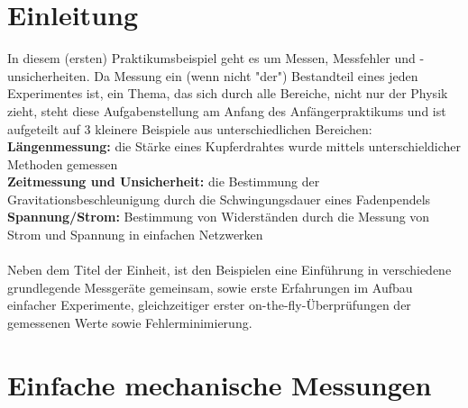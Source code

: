 \documentclass[12pt,a4paper]{article}
\begin{document}
\pagebreak
\setlength{\columnsep}{20pt}
\begin{multicols}{2}
\section{Einleitung}
In diesem (ersten) Praktikumsbeispiel geht es um Messen, Messfehler und -unsicherheiten.
Da Messung ein (wenn nicht "der") Bestandteil eines jeden Experimentes ist, ein Thema, das sich durch alle Bereiche, nicht nur der Physik zieht, steht diese Aufgabenstellung am Anfang des Anfängerpraktikums und ist aufgeteilt auf 3 kleinere Beispiele aus unterschiedlichen Bereichen:\\
\textbf{Längenmessung:} die Stärke eines Kupferdrahtes wurde mittels unterschieldicher Methoden gemessen\\
\textbf{Zeitmessung und Unsicherheit:} die Bestimmung der Gravitationsbeschleunigung durch die Schwingungsdauer eines Fadenpendels\\
\textbf{Spannung/Strom:} Bestimmung von Widerständen durch die Messung von Strom und Spannung in einfachen Netzwerken\\
\\
Neben dem Titel der Einheit, ist den Beispielen eine Einführung in verschiedene grundlegende Messgeräte gemeinsam, sowie erste Erfahrungen im Aufbau einfacher Experimente, gleichzeitiger erster on-the-fly-Überprüfungen der gemessenen Werte sowie Fehlerminimierung.
\section{Einfache mechanische Messungen}

\end{multicols}
\end{document}
